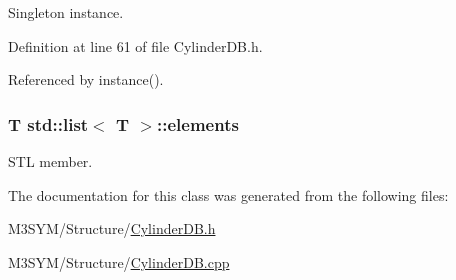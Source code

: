 Singleton instance. 



Definition at line 61 of file Cylinder\+D\+B.\+h.



Referenced by instance().

\hypertarget{classstd_1_1list_a682e5c7c91eb377d0cb4f019b2b81a5d}{
\subsubsection[{elements}]{\setlength{\rightskip}{0pt plus 5cm}T std\+::list$<$ T $>$\+::elements\hspace{0.3cm}{\ttfamily [inherited]}}}\label{classstd_1_1list_a682e5c7c91eb377d0cb4f019b2b81a5d}


S\+T\+L member. 



The documentation for this class was generated from the following files\+:\begin{DoxyCompactItemize}
\item 
M3\+S\+Y\+M/\+Structure/\hyperlink{CylinderDB_8h}{Cylinder\+D\+B.\+h}\item 
M3\+S\+Y\+M/\+Structure/\hyperlink{CylinderDB_8cpp}{Cylinder\+D\+B.\+cpp}\end{DoxyCompactItemize}
